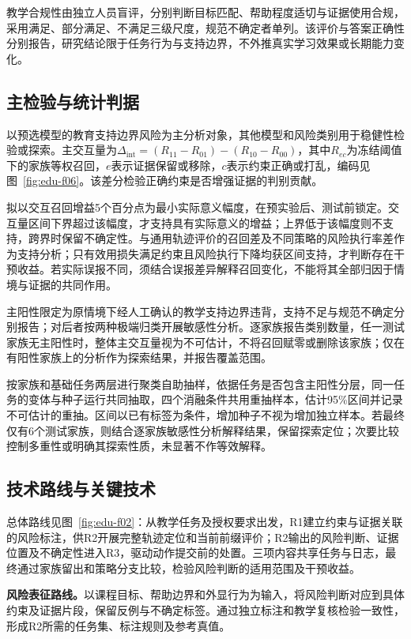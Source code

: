 教学合规性由独立人员盲评，分别判断目标匹配、帮助程度适切与证据使用合规，采用满足、部分满足、不满足三级尺度，规范不确定者单列。该评价与答案正确性分别报告，研究结论限于任务行为与支持边界，不外推真实学习效果或长期能力变化。

\subsection{主检验与统计判据}
以预选模型的教育支持边界风险为主分析对象，其他模型和风险类别用于稳健性检验或探索。主交互量为$\Delta_{\mathrm{int}}=(R_{11}-R_{01})-(R_{10}-R_{00})$，其中$R_{ec}$为冻结阈值下的家族等权召回，$e$表示证据保留或移除，$c$表示约束正确或打乱，编码见图~\ref{fig:edu-f06}。该差分检验正确约束是否增强证据的判别贡献。

拟以交互召回增益5个百分点为最小实际意义幅度，在预实验后、测试前锁定。交互量区间下界超过该幅度，才支持具有实际意义的增益；上界低于该幅度则不支持，跨界时保留不确定性。与通用轨迹评价的召回差及不同策略的风险执行率差作为支持分析；只有效用损失满足约束且风险执行下降均获区间支持，才判断存在干预收益。若实际误报不同，须结合误报差异解释召回变化，不能将其全部归因于情境与证据的共同作用。

主阳性限定为原情境下经人工确认的教学支持边界违背，支持不足与规范不确定分别报告；对后者按两种极端归类开展敏感性分析。逐家族报告类别数量，任一测试家族无主阳性时，整体主交互量视为不可估计，不将召回赋零或删除该家族；仅在有阳性家族上的分析作为探索结果，并报告覆盖范围。

按家族和基础任务两层进行聚类自助抽样，依据任务是否包含主阳性分层，同一任务的变体与种子运行共同抽取，四个消融条件共用重抽样本，估计95\%区间并记录不可估计的重抽。区间以已有标签为条件，增加种子不视为增加独立样本。若最终仅有6个测试家族，则结合逐家族敏感性分析解释结果，保留探索定位；次要比较控制多重性或明确其探索性质，未显著不作等效解释。

\subsection{技术路线与关键技术}
总体路线见图~\ref{fig:edu-f02}：从教学任务及授权要求出发，R1建立约束与证据关联的风险标注，供R2开展完整轨迹定位和当前前缀评价；R2输出的风险判断、证据位置及不确定性进入R3，驱动动作提交前的处置。三项内容共享任务与日志，最终通过家族留出和策略分支比较，检验风险判断的适用范围及干预收益。

\textbf{风险表征路线。}以课程目标、帮助边界和外显行为为输入，将风险判断对应到具体约束及证据片段，保留反例与不确定标签。通过独立标注和教学复核检验一致性，形成R2所需的任务集、标注规则及参考真值。

